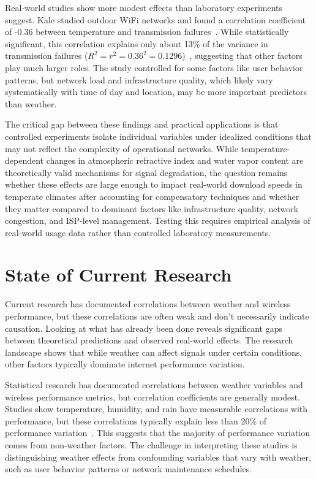 \documentclass[11pt]{report}
\begin{document}
Real-world studies show more modest effects than laboratory experiments suggest. Kale studied outdoor WiFi networks and found a correlation coefficient of -0.36 between temperature and transmission failures~\cite{kale2021impact}. While statistically significant, this correlation explains only about 13\% of the variance in transmission failures ($R^2 = r^2 = 0.36^2 = 0.1296$)~\cite{cohen1988statistical}, suggesting that other factors play much larger roles. The study controlled for some factors like user behavior patterns, but network load and infrastructure quality, which likely vary systematically with time of day and location, may be more important predictors than weather.

The critical gap between these findings and practical applications is that controlled experiments isolate individual variables under idealized conditions that may not reflect the complexity of operational networks. While temperature-dependent changes in atmospheric refractive index and water vapor content are theoretically valid mechanisms for signal degradation, the question remains whether these effects are large enough to impact real-world download speeds in temperate climates after accounting for compensatory techniques and whether they matter compared to dominant factors like infrastructure quality, network congestion, and ISP-level management. Testing this requires empirical analysis of real-world usage data rather than controlled laboratory measurements.

\section{State of Current Research}

Current research has documented correlations between weather and wireless performance, but these correlations are often weak and don't necessarily indicate causation. Looking at what has already been done reveals significant gaps between theoretical predictions and observed real-world effects. The research landscape shows that while weather can affect signals under certain conditions, other factors typically dominate internet performance variation.

Statistical research has documented correlations between weather variables and wireless performance metrics, but correlation coefficients are generally modest. Studies show temperature, humidity, and rain have measurable correlations with performance, but these correlations typically explain less than 20\% of performance variation~\cite{kale2021impact}. This suggests that the majority of performance variation comes from non-weather factors. The challenge in interpreting these studies is distinguishing weather effects from confounding variables that vary with weather, such as user behavior patterns or network maintenance schedules.
\end{document}
